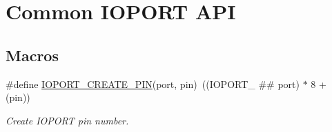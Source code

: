 \hypertarget{group__ioport__group}{\section{Common I\-O\-P\-O\-R\-T A\-P\-I}
\label{group__ioport__group}
}
\subsection*{Macros}
\begin{DoxyCompactItemize}
\item 
\#define \hyperlink{group__ioport__group_gabc09edad7c3187dec63ce47e6f1b3c51}{I\-O\-P\-O\-R\-T\-\_\-\-C\-R\-E\-A\-T\-E\-\_\-\-P\-I\-N}(port, pin)~((I\-O\-P\-O\-R\-T\-\_\- \#\# port) $\ast$ 8 + (pin))
\begin{DoxyCompactList}\small\item\em Create I\-O\-P\-O\-R\-T pin number. \end{DoxyCompactList}\end{DoxyCompactItemize}
